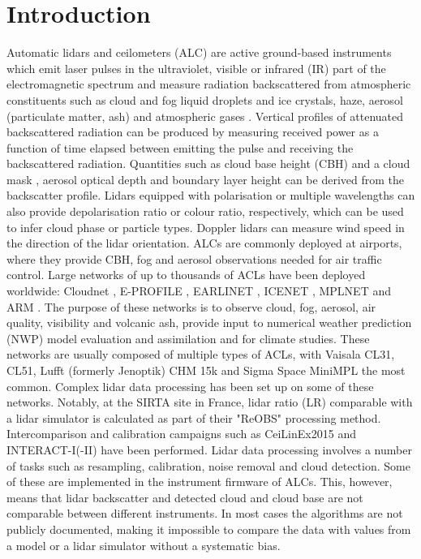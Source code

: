 \section{Introduction}

Automatic lidars and ceilometers (ALC) are active ground-based instruments
which emit laser pulses in the ultraviolet, visible or infrared (IR) part of the
electromagnetic spectrum and measure radiation backscattered from atmospheric
constituents such as cloud and fog liquid droplets and ice crystals, haze,
aerosol (particulate matter, ash) and atmospheric gases \citep{emeis2010}.
Vertical profiles of attenuated backscattered radiation can be produced
by measuring received power as a function of time elapsed between emitting the
pulse and receiving the backscattered radiation. Quantities such as
cloud base height (CBH) and a cloud mask
\citep{pal1992,wang2001,martucci2010,costa-suros2013,tricht2014,liu2015b,liu2015a,lewis2016,cromwell2019,silber2018}, aerosol optical depth
\citep{marenco1997,welton2000,welton2002,wiegner2012,wiegner2014,jin2015,dionisi2018} and boundary layer height
\citep{eresmaa2006,munkel2007,emeis2009,tsaknakis2011,milroy2012,knepp2017}
can be derived from the
backscatter profile. Lidars equipped with polarisation or multiple wavelengths
can also provide depolarisation ratio or colour ratio, respectively, which can be used
to infer cloud phase or particle types. Doppler lidars can measure wind
speed in the direction of the lidar orientation. ALCs are commonly deployed
at airports, where they provide CBH, fog and aerosol observations
needed for air traffic control. Large networks of up to
thousands of ACLs have been deployed worldwide: Cloudnet \citep{illingworth2007},
E-PROFILE \citep{illingworth2018}, EARLINET \citep{pappalardo2014},
ICENET \citep{cazorla2017}, MPLNET \citep{welton2006} and ARM \citep{stokes1994,campbell2002}.
The purpose of these networks is to observe cloud, fog, aerosol, air quality,
visibility and volcanic ash, provide input to numerical weather prediction (NWP)
model evaluation and
assimilation \citep{illingworth2015a,illingworth2018} and for climate studies.
These networks are usually composed of multiple types of ACLs, with Vaisala CL31,
CL51, Lufft (formerly Jenoptik) CHM 15k and Sigma Space MiniMPL
the most common.
Complex lidar data processing has been set up on some of these networks. Notably,
at the SIRTA site in France, lidar ratio (LR)
comparable with a lidar simulator \citep{chiriaco2018} is calculated 
as part of their "ReOBS" processing method. Intercomparison and calibration campaigns such as
CeiLinEx2015 \citep{mattis2016} and INTERACT-I(-II)
\citep{rosoldi2018,madonna2018} have been performed.
Lidar data processing involves a number of tasks such as resampling,
calibration, noise removal and cloud detection. Some of these are implemented
in the instrument firmware of ALCs. This, however, means that
lidar backscatter and detected cloud and cloud base are not comparable
between different instruments. In most cases the algorithms are not publicly
documented, making it impossible to compare the data with values from a model or a lidar simulator
without a systematic bias.

